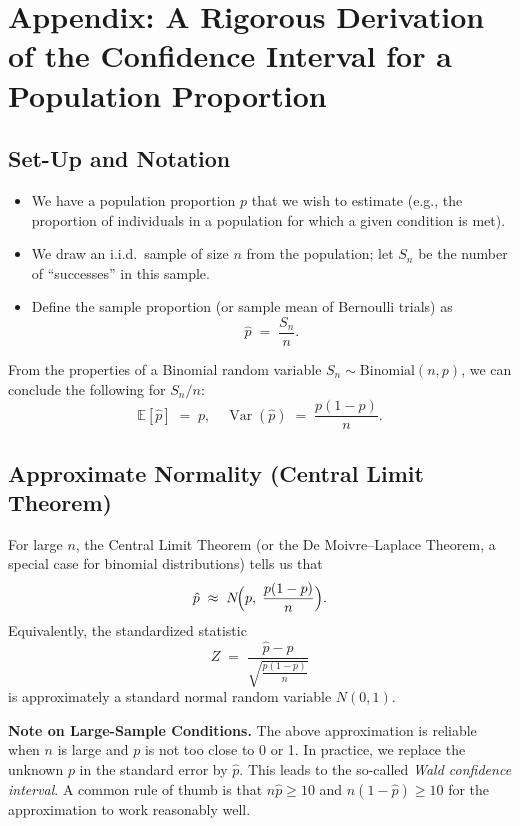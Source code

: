 \documentclass[11pt]{article}
\begin{document}
\newpage
\appendix 


\section*{Appendix: A Rigorous Derivation of the Confidence Interval for a Population Proportion}
\subsection*{Set-Up and Notation}

\begin{itemize}
  \item We have a population proportion \(p\) that we wish to estimate (e.g., the proportion of individuals in a population for which a given condition is met).
  \item We draw an i.i.d.\ sample of size \(n\) from the population; let \(S_n\) be the number of ``successes'' in this sample.
  \item Define the sample proportion (or sample mean of Bernoulli trials) as
  \[
    \hat{p} \;=\; \frac{S_n}{n}.
  \]
\end{itemize}

From the properties of a Binomial random variable \(S_n \sim \mathrm{Binomial}(n,p)\), we can conclude the following for $S_n/n$:
\[
  \mathbb{E}[\hat{p}] \;=\; p,
  \quad
  \operatorname{Var}(\hat{p}) \;=\; \frac{p(1-p)}{n}.
\]

\subsection*{Approximate Normality (Central Limit Theorem)}

For large \(n\), the Central Limit Theorem (or the De Moivre--Laplace Theorem, a special case for binomial distributions) tells us that
\[
  \hat{p} \;\approx\; N\!\Bigl(p,\;\frac{p(1-p)}{n}\Bigr).
\]
Equivalently, the standardized statistic
\[
  Z \;=\; \frac{\hat{p} - p}{\sqrt{\frac{p(1-p)}{n}}}
\]
is approximately a standard normal random variable \(N(0,1)\).

\textbf{Note on Large-Sample Conditions.} 
The above approximation is reliable when \(n\) is large and \(p\) is not too close to 0 or 1. In practice, we replace the unknown \(p\) in the standard error by \(\hat{p}\). This leads to the so-called \emph{Wald confidence interval}. A common rule of thumb is that \(n\hat{p} \ge 10\) and \(n(1 - \hat{p}) \ge 10\) for the approximation to work reasonably well.
\end{document}
